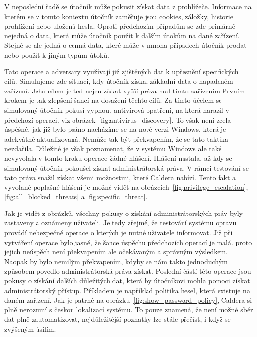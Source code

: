 
V neposlední řadě se útočník může pokusit získat data z prohlížeče.
Informace na kterém se v tomto kontextu útočník zaměřuje jsou cookies, záložky, historie prohlížení nebo uložená hesla.
Oproti předchozím případům se zde primárně nejedná o data, která může útočník použít k dalším útokům na dané zařízení.
Stejně se ale jedná o cenná data, které může v mnoha případech útočník prodat nebo použít k jiným typům útoků.

Tato operace a adversary využívají již zjištěných dat k upřesnění specifických cílů.
Simulujeme zde situaci, kdy útočník získal základní data o napadeném zařízení.
Jeho cílem je ted nejen získat vyšší práva nad tímto zařízením
Prvním krokem je tak zlepšení šancí na dosažení těchto cílů.
Za tímto účelem se simulovaný útočník pokusí vypnout antivirová opatření, na která narazil v předchozí operaci, viz obrázek~\ref{fig:antivirus_discovery}.
To však není zcela úspěšné, jak již bylo psáno nacházíme se na nové verzi Windows, která je adekvátně aktualizovaná.
Nemůže tak být překvapením, že se tato taktika nezdařila.
Důležité je však poznamenat, že v systému Windows ale také nevyvolala v tomto kroku operace žádné hlášení.
Hlášení nastala, až kdy se simulovaný útočník pokoušel získat administrátorská práva.
V rámci testování se tato práva snažil získat všemi možnostmi, které Caldera nabízí.
Tento fakt a vyvolané poplašné hlášení je možné vidět na obrázcích~\ref{fig:privilege_escalation},\ref{fig:all_blocked_threats} a \ref{fig:specific_threat}.


Jak je vidět z obrázků, všechny pokusy o získání administrátorských práv byly zastaveny a oznámeny uživateli.
Je tedy zřejmé, že testování systému opravu provádí nebezpečné operace o kterých je nutné uživatele informovat.
Již při vytváření operace bylo jasné, že šance úspěchu předchozích operací je malá.
proto jejich neúspěch není překvapením ale očekávaným a správným výsledkem.
Naopak by bylo nemilým překvapením, kdyby se nám takto jednoduchým způsobem povedlo administrátorská práva získat.
Poslední částí této operace jsou pokusy o získání dalších důležitých dat, která by útočníkovi mohla pomoci získat administrátorský přístup.
Příkladem je například politika hesel, která existuje na daném zařízení.
Jak je patrné na obrázku~\ref{fig:show_password_policy}, Caldera si plně nerozumí s českou lokalizací systému.
To pouze znamená, že není možné sběr dat plně zautomatizovat, nejdůležitější poznatky lze stále přečíst, i když se zvýšeným úsilím.

